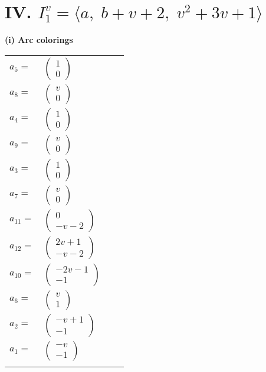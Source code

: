 \documentclass[1p]{elsarticle_modified}
\theoremstyle{definition}
\begin{document}
\centering \section*{IV. $I^v_{1}= \langle a,\;b+v+2,\;v^2+3 v+1 \rangle$}
\flushleft \textbf{(i) Arc colorings}\\
\begin{tabular}{m{7pt} m{180pt} m{7pt} m{180pt} }
\flushright $a_{5}=$&$\begin{pmatrix}1\\0\end{pmatrix}$ \\
\flushright $a_{8}=$&$\begin{pmatrix}v\\0\end{pmatrix}$ \\
\flushright $a_{4}=$&$\begin{pmatrix}1\\0\end{pmatrix}$ \\
\flushright $a_{9}=$&$\begin{pmatrix}v\\0\end{pmatrix}$ \\
\flushright $a_{3}=$&$\begin{pmatrix}1\\0\end{pmatrix}$ \\
\flushright $a_{7}=$&$\begin{pmatrix}v\\0\end{pmatrix}$ \\
\flushright $a_{11}=$&$\begin{pmatrix}0\\- v-2\end{pmatrix}$ \\
\flushright $a_{12}=$&$\begin{pmatrix}2 v+1\\- v-2\end{pmatrix}$ \\
\flushright $a_{10}=$&$\begin{pmatrix}-2 v-1\\-1\end{pmatrix}$ \\
\flushright $a_{6}=$&$\begin{pmatrix}v\\1\end{pmatrix}$ \\
\flushright $a_{2}=$&$\begin{pmatrix}- v+1\\-1\end{pmatrix}$ \\
\flushright $a_{1}=$&$\begin{pmatrix}- v\\-1\end{pmatrix}$\\&\end{tabular}
\end{document}
